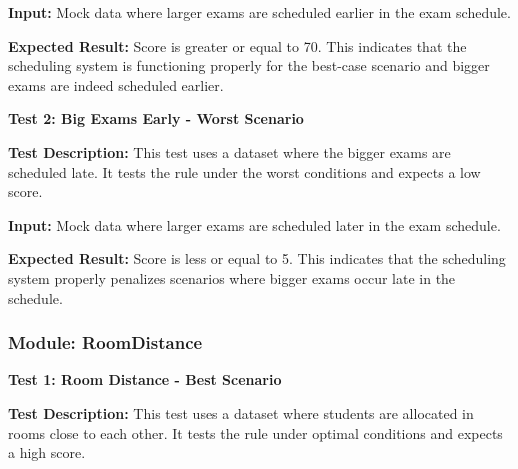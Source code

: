  \textbf{Input:}
 Mock data where larger exams are scheduled earlier in the exam schedule.


\vspace{\baselineskip}

 
 \textbf{Expected Result:}
 Score is greater or equal to 70. This indicates that the scheduling system is
functioning properly for the best-case scenario and bigger exams are indeed scheduled earlier.


\vspace{\baselineskip}

 
 \textbf{Test 2: Big Exams Early - Worst Scenario}


\vspace{\baselineskip}

 
 \textbf{Test Description:}
This test uses a dataset where the bigger exams are scheduled late. It tests the
rule under the worst conditions and expects a low score.


\vspace{\baselineskip}


 \textbf{Input:}
 Mock data where larger exams are scheduled later in the exam schedule.


\vspace{\baselineskip}

 
 \textbf{Expected Result:}
 Score is less or equal to 5. This indicates that the scheduling system properly
penalizes scenarios where bigger exams occur late in the schedule.


\vspace{\baselineskip}



 \subsubsection{Module: RoomDistance}

 
\vspace{\baselineskip}


 
 \textbf{Test 1: Room Distance - Best Scenario}


\vspace{\baselineskip}

 
 \textbf{Test Description:}
 This test uses a dataset where students are allocated in rooms close to each
other. It tests the rule under optimal conditions and expects a high score.


\vspace{\baselineskip}


